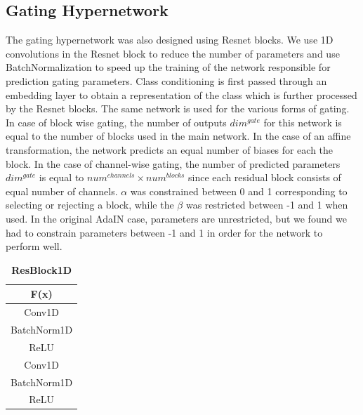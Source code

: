 \subsection{Gating Hypernetwork}
The gating hypernetwork was also designed using Resnet blocks. We use 1D convolutions in the Resnet block  to reduce the number of parameters and use BatchNormalization to speed up the training of the network responsible for prediction gating parameters. 
Class conditioning is first passed through an embedding layer to obtain a representation of the class which is further processed by the Resnet blocks. 
The same network is used for the various forms of gating. In case of block wise gating, the number of outputs $dim^{gate}$ for this network is equal to the number of blocks used in the main network.
In the case of an affine transformation, the network predicts an equal number of biases for each the block. 
In the case of channel-wise gating, the number of predicted parameters $dim^{gate}$ is equal to $num^{channels}\times num^{blocks}$ since each residual block consists of equal number of channels.
$\alpha$ was constrained between 0 and 1 corresponding to selecting or rejecting a block, while the $\beta$ was restricted between -1 and 1 when used. 
In the original AdaIN case, parameters are unrestricted, but we found we had to constrain parameters between -1 and 1 in order for the network to perform well. 

\begin{table}[ht]
\caption{\textbf{ResBlock1D}} %
\centering %
\begin{tabular}{c} %
\toprule
\textbf{F(x)}\\\midrule
Conv1D\\ %
BatchNorm1D\\
ReLU \\
Conv1D\\
BatchNorm1D\\
ReLU \\
\bottomrule %
\end{tabular}
\label{table:resblock1D} %
\end{table}









